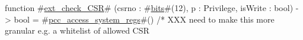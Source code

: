 function #\hyperref[sailRISCVzextzycheckzyCSR]{ext\_check\_CSR}# (csrno : #\hyperref[sailRISCVzbits]{bits}#(12), p : Privilege, isWrite : bool) -> bool =
  #\hyperref[sailRISCVzpcczyaccesszysystemzyregs]{pcc\_access\_system\_regs}#() /* XXX need to make this more granular e.g. a whitelist of allowed CSR
